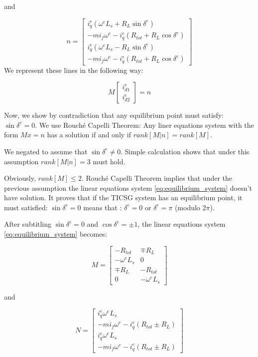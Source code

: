 \documentclass[letterpaper, 10 pt, conference]{ieeeconf}  %
\begin{document}
and 

\[
n=\left[\begin{array}{c}
i_{q}^{e}\left(\omega^{e}L_{s}+R_{L}\sin\delta^{e}\right)\\
-mi_{f}\omega^{e}-i_{q}^{e}\left(R_{tot}+R_{L}\cos\delta^{e}\right)\\
i_{q}^{e}\left(\omega^{e}L_{s}-R_{L}\sin\delta^{e}\right)\\
-mi_{f}\omega^{e}-i_{q}^{e}\left(R_{tot}+R_{L}\cos\delta^{e}\right)
\end{array}\right]
\]
We represent these lines in the following way:

\begin{equation}
M\left[\begin{array}{c}
i_{d1}^{e}\\
i_{d2}^{e}
\end{array}\right]=n\label{eq:equilibrium_system}
\end{equation}

Now, we  show by contradiction that any equilibrium point must satisfy: $\sin\delta^e=0$.
We use Rouch\'e Capelli Theorem:  Any liner equations system with the form  $Mx=n$ has a  solution if and only if $rank\left[M|n\right]=rank\left[M\right].$

We negated to assume that $\sin\delta^{e}\ne0$. Simple calculation shows that under this assumption   $rank\left[M|n\right]=3$ must hold.

Obviously, $rank\left[M\right]\le2$.  Rouch\'e Capelli Theorem implies that under the
previous assumption the linear equations system \eqref{eq:equilibrium_system} doesn't have solution. It proves that  if the TICSG system has an equilibrium point, it must satisfied: $\sin\delta^{e}=0$ means that : $\delta^{e}=0$ or $\delta^e = \pi$ (modulo $2\pi$).

After subtitling $\sin\delta^{e}=0$
and $\cos\delta^{e}=\pm 1$, the linear equations system  \eqref{eq:equilibrium_system} becomes:

$$
M=\left[\begin{array}{cc}
-R_{tot} & \mp R_{L}\\
-\omega^{e}L_{s} & 0\\
  \mp R_{L} & -R_{tot}\\
0 & -\omega^{e}L_{s}
\end{array}\right]
$$

and 

$$
N=\left[\begin{array}{c}
i_{q}^{e}\omega^{e}L_{s}\\
-mi_{f}\omega^{e}-i_{q}^{e}\left(R_{tot} \pm R_{L}\right)\\
i_{q}^{e}\omega^{e}L_{s}\\
-mi_{f}\omega^{e}-i_{q}^{e}\left(R_{tot} \pm R_{L}\right)
\end{array}\right]
$$
\end{document}

